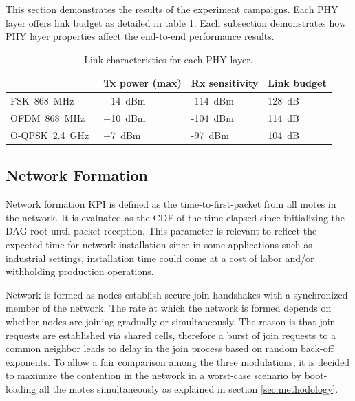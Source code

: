\documentclass[sensors,article,submit,moreauthors,pdftex]{Definitions/mdpi}
\newcommand{\fsk}          {FSK~868~MHz}
\newcommand{\oqpsk}        {O-QPSK~2.4~GHz}
\newcommand{\ofdm}         {OFDM~868~MHz}
\begin{document}
This section demonstrates the results of the experiment campaigns.
Each PHY layer offers link budget as detailed in table \ref{tab:linkbudget}. 
Each subsection demonstrates how PHY layer properties affect the end-to-end performance results. 

\begin{table}
    \centering
    \begin{tabular}{|l|l|l|l|}
        \hline
                & Tx power (max) & Rx sensitivity & Link budget \\ \hline
        \fsk\   & +14~dBm        & -114~dBm       & 128~dB      \\ \hline
        \ofdm\  & +10~dBm        & -104~dBm       & 114~dB      \\ \hline
        \oqpsk\ & +7~dBm         & -97~dBm        & 104~dB      \\ \hline
    \end{tabular}
    \caption{Link characteristics for each PHY layer.}
    \label{tab:linkbudget}
\end{table}

\subsection{Network Formation}
\label{sec:network_formation}


Network formation KPI is defined as the time-to-first-packet  from all motes in the network.
It is evaluated as the CDF of the time elapsed since initializing the DAG root until packet reception. 
This parameter is relevant to reflect the expected time for network installation since in some applications such as industrial settings, installation time could come at a cost of labor and/or withholding production operations.


Network is formed as nodes establish secure join handshakes with a synchronized member of the network.
The rate at which the network is formed depends on whether nodes are joining gradually or  simultaneously.
The reason is that join requests are established via shared cells, therefore a burst of join requests to a common neighbor leads to delay in the join process based on random back-off exponents. 
To allow a fair comparison among the three modulations, it is decided to maximize the contention in the network in a worst-case scenario by boot-loading all the motes simultaneously as explained in section \ref{sec:methodology}.
\end{document}

